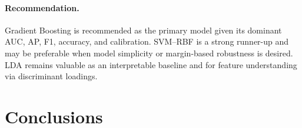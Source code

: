 \documentclass[journal]{IEEEtran}
\begin{document}
\paragraph{Recommendation.}
Gradient Boosting is recommended as the primary model given its dominant AUC, AP,
F1, accuracy, and calibration. SVM–RBF is a strong runner-up and may be preferable
when model simplicity or margin-based robustness is desired. LDA remains valuable
as an interpretable baseline and for feature understanding via discriminant loadings.
	\section{Conclusions}
	\label{sec:conclusion}


	

	
\end{document}
